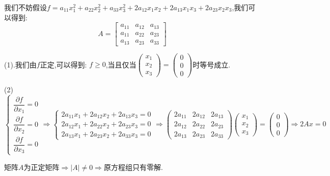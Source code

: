 \begin{solution}

	我们不妨假设$f=a_{11}x_{1}^2+a_{22}x_{2}^2+a_{33}x_{3}^2+2a_{12}x_{1}x_{2}+2a_{13}x_{1}x_{3}+2a_{23}x_{2}x_{3}$,我们可以得到:  
	$$A=\left[ \begin{matrix}
		a_{11}&a_{12}&a_{13}\\
		a_{11}&a_{22}&a_{23}\\
		a_{13}&a_{23}&a_{33}
	\end{matrix}\right] $$

	(1).我们由$f$正定,可以得到:  $f\geq 0$,当且仅当$\left(\begin{matrix}
		x_{1}\\x_{2}\\x_{3}
	\end{matrix} \right) =\left( \begin{matrix}
	0\\0\\0
\end{matrix}\right) $时等号成立.

(2)
$$\left\lbrace
\begin{array}{l}
	\dfrac{\partial f}{\partial x_{1}}=0\\
	\dfrac{\partial f}{\partial x_{2}}=0\\
	\dfrac{\partial f}{\partial x_{3}}=0
\end{array}
\right. \Rightarrow \left\lbrace
\begin{array}{l}
	2a_{11}x_{1}+2a_{12}x_{2}+2a_{13}x_{3}=0\\
	2a_{12}x_{1}+2a_{22}x_{2}+2a_{23}x_{3}=0\\
	2a_{13}x_{1}+2a_{23}x_{2}+2a_{33}x_{3}=0
\end{array}
\right. \Rightarrow \left( \begin{matrix}
	2a_{11}&2a_{12}&2a_{13}\\
	2a_{12}&2a_{22}&2a_{23}\\
	2a_{13}&2a_{23}&2a_{33}
\end{matrix}\right) \left(\begin{matrix}
x_{1}\\x_{2}\\x_{3}
\end{matrix} \right) =\left( \begin{matrix}
0\\0\\0
\end{matrix}\right) \Rightarrow 2Ax=0$$

矩阵$A$为正定矩阵$\Rightarrow |A|\neq 0\Rightarrow$原方程组只有零解.


\end{solution}
